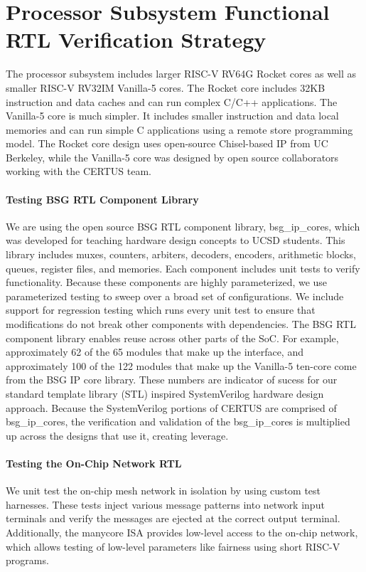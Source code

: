 
\section{Processor Subsystem Functional RTL Verification Strategy}

The processor subsystem includes larger RISC-V RV64G Rocket cores as well
as smaller RISC-V RV32IM Vanilla-5 cores. The Rocket core includes 32KB
instruction and data caches and can run complex C/C++ applications. The
Vanilla-5 core is much simpler. It includes smaller instruction and data
local memories and can run simple C applications using a remote store
programming model. The Rocket core design uses open-source Chisel-based
IP from UC Berkeley, while the Vanilla-5 core was designed by open source collaborators working with the CERTUS
team.

\paragraph{Testing BSG RTL Component Library}
We are using the open source BSG RTL component library, bsg\_ip\_cores, which was developed for teaching hardware design concepts to UCSD students.
This library includes muxes, counters, arbiters, decoders, encoders,
arithmetic blocks, queues, register files, and memories. Each component
includes unit tests to verify functionality. Because these components are
highly parameterized, we use parameterized testing to sweep over a broad
set of configurations. We include support for regression testing which
runs every unit test to ensure that modifications do not break other
components with dependencies. The BSG RTL component library enables reuse
across other parts of the SoC. For example, approximately 62 of the 65
modules that make up the  interface, and approximately 100 of
the 122 modules that make up the Vanilla-5 ten-core come from the BSG IP
core library. These numbers are indicator of sucess for our standard template library (STL) inspired SystemVerilog hardware design approach. Because the SystemVerilog portions of CERTUS are comprised of bsg\_ip\_cores, the verification and validation of the bsg\_ip\_cores is multiplied up across the designs that use it, creating leverage.

\paragraph{Testing the On-Chip Network RTL}
We unit test the on-chip mesh network in isolation by using custom test
harnesses. These tests inject various message patterns into network input
terminals and verify the messages are ejected at the correct output
terminal. Additionally, the manycore ISA provides low-level access to the on-chip network, which allows testing of low-level parameters like fairness using short RISC-V programs.

